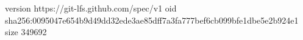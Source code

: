 version https://git-lfs.github.com/spec/v1
oid sha256:0095047e654b9d49dd32ede3ae85dff7a3fa777bef6cb099bfe1dbe5e2b924e1
size 349692
